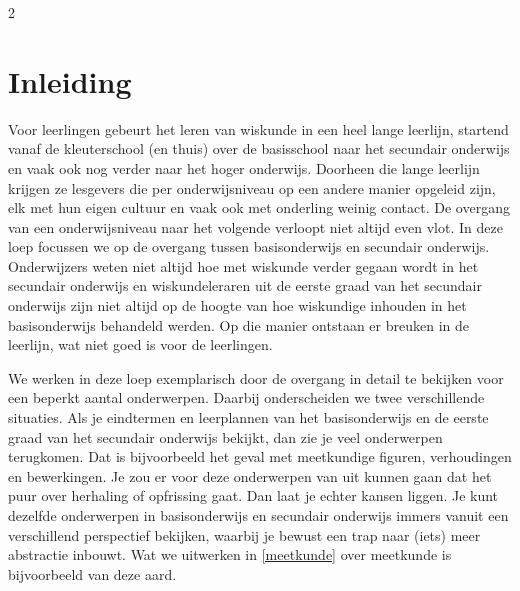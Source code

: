 

\startcontents[inhoudloep]
\begin{multicols}{2}

\inhoudstafelloep

\section{Inleiding}\label{inleiding}

Voor leerlingen gebeurt het leren van wiskunde in een heel lange leerlijn, startend vanaf de kleuterschool (en thuis) over de basisschool naar het secundair onderwijs en vaak ook nog verder naar het hoger onderwijs.
Doorheen die lange leerlijn krijgen ze lesgevers die per onderwijsniveau op een andere manier opgeleid zijn, elk met hun eigen cultuur en vaak ook met onderling weinig contact.
De overgang van een onderwijsniveau naar het volgende verloopt niet altijd even vlot.
In deze loep focussen we op de overgang tussen basisonderwijs en secundair onderwijs.
Onderwijzers weten niet altijd hoe met wiskunde verder gegaan wordt in het secundair onderwijs en wiskundeleraren uit de eerste graad van het secundair onderwijs zijn niet altijd op de hoogte van hoe wiskundige inhouden in het basisonderwijs behandeld werden.
Op die manier ontstaan er breuken in de leerlijn, wat niet goed is voor de leerlingen.

We werken in deze loep exemplarisch door de overgang in detail te bekijken voor een beperkt aantal onderwerpen.
Daarbij onderscheiden we twee verschillende situaties.
Als je eindtermen en leerplannen van het basisonderwijs en de eerste graad van het secundair onderwijs bekijkt, dan zie je veel onderwerpen terugkomen.
Dat is bijvoorbeeld het geval met meetkundige figuren, verhoudingen en bewerkingen.
Je zou er voor deze onderwerpen van uit kunnen gaan dat het puur over herhaling of opfrissing gaat.
Dan laat je echter kansen liggen.
Je kunt dezelfde onderwerpen in basisonderwijs en secundair onderwijs immers vanuit een verschillend perspectief bekijken, waarbij je bewust een trap naar (iets) meer abstractie inbouwt.
Wat we uitwerken in \autoref{meetkunde} over meetkunde is bijvoorbeeld van deze aard.


\end{multicols}
